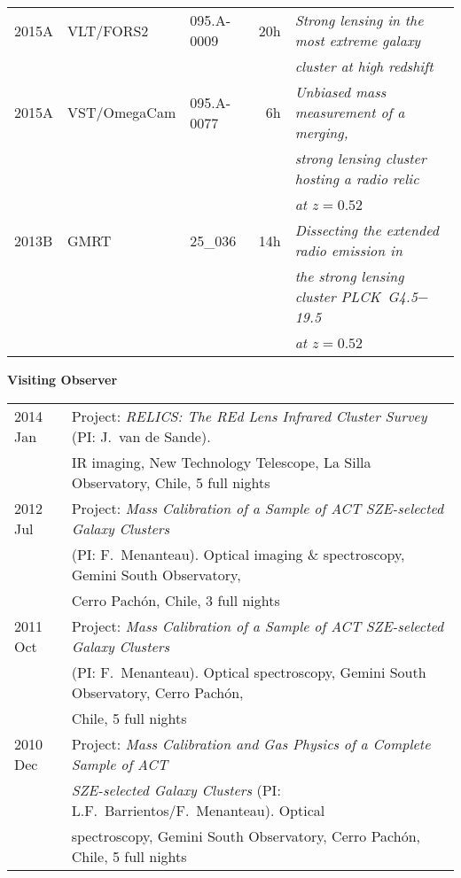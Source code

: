 \documentclass[11pt]{article}
\begin{document}
\begin{table}[h!]
\begin{tabular}{l l l r l}
2015A & VLT/FORS2     & 095.A-0009 & 20h & {\it Strong lensing in the most extreme galaxy}\\
      &               &            &     & {\it cluster at high redshift}\\
2015A & VST/OmegaCam  & 095.A-0077 & 6h & {\it Unbiased mass measurement of a merging,}\\
      &               &            &     & {\it strong lensing cluster hosting a radio relic}\\
      &               &            &     & {\it at $z=0.52$}\\
2013B & GMRT          & 25\_036    & 14h & {\it Dissecting the extended radio emission in}\\
      &               &            &     & {\it the strong lensing cluster PLCK~G4.5$-$19.5}\\
      &               &            &     & {\it at $z=0.52$}
\end{tabular}
\end{table}


\noindent
{\bf\Large Visiting Observer}\\
\vspace{-0.2cm}

\begin{table}[h!]
\begin{tabular}{l l}
2014 Jan & Project: {\it RELICS: The REd Lens Infrared Cluster Survey} (PI: J.~van de Sande).\\
         & IR imaging, New Technology Telescope, La Silla Observatory, Chile, 5 full nights\\
2012 Jul & Project: {\it Mass Calibration of a Sample of ACT SZE-selected Galaxy Clusters}\\
         & (PI: F.~Menanteau). Optical imaging \& spectroscopy, Gemini South Observatory,\\
         & Cerro Pach\'on, Chile, 3 full nights\\
2011 Oct & Project: {\it Mass Calibration of a Sample of ACT SZE-selected Galaxy Clusters}\\
         & (PI: F.~Menanteau). Optical spectroscopy, Gemini South Observatory, Cerro Pach\'on,\\
         & Chile, 5 full nights\\
2010 Dec & Project: {\it Mass Calibration and Gas Physics of a Complete Sample of ACT}\\
         & {\it SZE-selected Galaxy Clusters} (PI: L.F.~Barrientos/F.~Menanteau). Optical\\
         & spectroscopy, Gemini South Observatory, Cerro Pach\'on, Chile, 5 full nights\\
\end{tabular}
\end{table}
\end{document}
